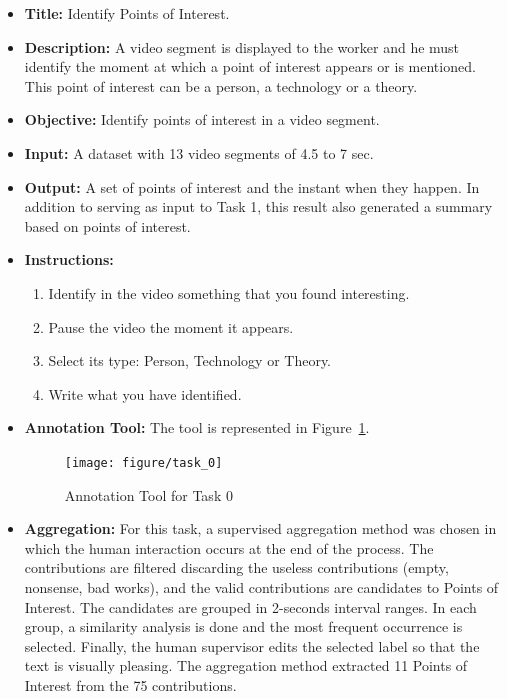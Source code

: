 \begin{itemize}
\item \textbf{Title:} Identify Points of Interest.

\item \textbf{Description:} A video segment is displayed to the worker and he must identify the moment at which a point of interest appears or is mentioned. This point of interest can be a person, a technology or a theory.

\item \textbf{Objective:} Identify points of interest in a video segment.


\item \textbf{Input:} A dataset with 13 video segments of 4.5 to 7 sec.


\item \textbf{Output:} A set of points of interest and the instant when they happen. In addition to serving as input to Task 1, this result also generated a summary based on points of interest.


\item \textbf{Instructions:} \begin{enumerate}
	\item Identify in the video something that you found interesting.
	\item Pause the video the moment it appears.
	\item Select its type: Person, Technology or Theory.
	\item Write what you have identified. 
\end{enumerate}

\item \textbf{Annotation Tool:} The tool is represented in Figure~\ref{task_0}.
\begin{figure}[h!]
	\centerline{\texttt{[image: figure/task\_0]}}
	\caption{Annotation Tool for Task 0}
	\label{task_0}
\end{figure}

\item \textbf{Aggregation:} For this task, a supervised aggregation method was chosen in which the human interaction occurs at the end of the process. The contributions are filtered discarding the useless contributions (empty, nonsense, bad works), and the valid contributions are candidates to Points of Interest. The candidates are grouped in 2-seconds interval ranges. In each group, a similarity analysis is done and the most frequent occurrence is selected. Finally, the human supervisor edits the selected label so that the text is visually pleasing. The aggregation method extracted 11 Points of Interest from the 75 contributions.

\end{itemize}



